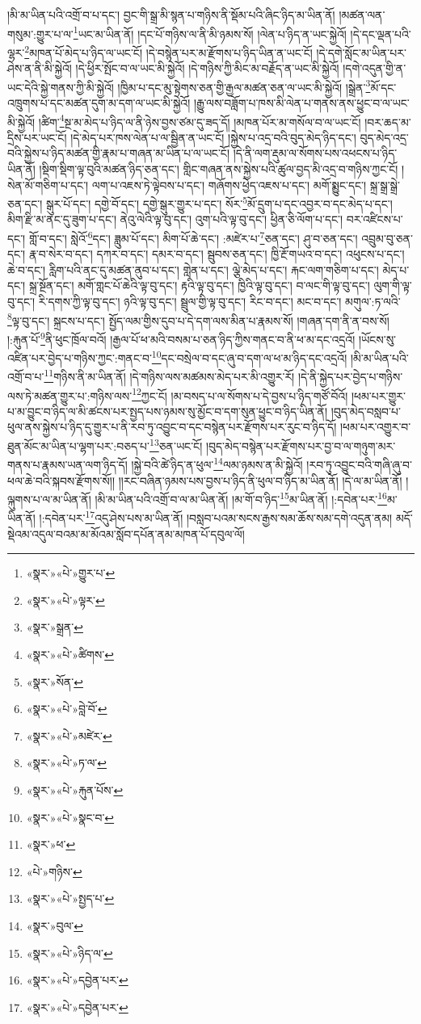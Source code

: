 །མི་མ་ཡིན་པའི་འགྲོ་བ་པ་དང་། བྱང་གི་སྒྲ་མི་སྙན་པ་གཉིས་ནི་སྡོམ་པའི་ཞིང་ཉིད་མ་ཡིན་ནོ། །མཚན་ལན་གསུམ་:གྱུར་པ་ལ་\footnote{«སྣར་»«པེ་»གྱུར་པ་}ཡང་མ་ཡིན་ནོ། །དང་པོ་གཉིས་ལ་ནི་མི་ཉམས་སོ། །ལེན་པ་ཉིད་ན་ཡང་སྐྱེའོ། །དེ་དང་ལྡན་པའི་ལྷར་\footnote{«སྣར་»«པེ་»ལྟར་}མཁན་པོ་མེད་པ་ཉིད་ལ་ཡང་ངོ། །དེ་བསྙེན་པར་མ་རྫོགས་པ་ཉིད་ཡིན་ན་ཡང་ངོ། །དེ་དགེ་སློང་མ་ཡིན་པར་ཤེས་ན་ནི་མི་སྐྱེའོ། །དེ་ཕྱིར་སྤོང་བ་ལ་ཡང་མི་སྐྱེའོ། །དེ་གཉིས་ཀྱི་མིང་མ་བརྗོད་ན་ཡང་མི་སྐྱེའོ། །དགེ་འདུན་གྱི་ན་ཡང་དེའི་སྐྱེ་གནས་ཀྱི་མི་སྐྱེའོ། །ཁྱིམ་པ་དང་མུ་སྟེགས་ཅན་གྱི་རྒྱལ་མཚན་ཅན་ལ་ཡང་མི་སྐྱེའོ། །སྒྲེན་\footnote{«སྣར་»སྒྲན་}མོ་དང་འཁྲུགས་པ་དང་མཚན་དུག་མ་དག་ལ་ཡང་མི་སྐྱེའོ། །རྒྱུ་ལས་བཟློག་པ་ཁས་མི་ལེན་པ་གནས་ནས་ཕྱུང་བ་ལ་ཡང་མི་སྐྱེའོ། །ཚིག་\footnote{«སྣར་»«པེ་»ཚིགས་}སྔ་མ་མེད་པ་ཉིད་ལ་ནི་ཉེས་བྱས་ཙམ་དུ་ཟད་དོ། །མཁན་པོར་མ་གསོལ་བ་ལ་ཡང་ངོ། །བར་ཆད་མ་དྲིས་པར་ཡང་ངོ། །དེ་མེད་པར་ཁས་ལེན་པ་ལ་སྦྱིན་ན་ཡང་ངོ། །སྐྱེས་པ་འདྲ་བའི་བུད་མེད་ཉིད་དང་། བུད་མེད་འདྲ་བའི་སྐྱེས་པ་ཉིད་མཚན་གྱི་རྣམ་པ་གཞན་མ་ཡིན་པ་ལ་ཡང་ངོ། །དེ་ནི་ལག་རྡུམ་ལ་སོགས་པས་འཕངས་པ་ཉིད་ཡིན་ནོ། །སྡིག་སྡིག་ལྟ་བུའི་མཚན་ཉིད་ཅན་དང་། གླིང་གཞན་ནས་སྐྱེས་པའི་ཚུལ་བྱད་མི་འདྲ་བ་གཉིས་ཀྱང་ངོ། །སེན་མོ་གཅིག་པ་དང་། ལག་པ་འཇས་ཏེ་ལྟེབས་པ་དང་། གཞོགས་ཕྱེད་འཇས་པ་དང་། མགོ་སྨྱུང་དང་། སྐྲ་སྒྲ་སྒྲེ་ཅན་དང་། སྒུར་པོ་དང་། དགྱེ་བོ་དང་། དགྱེ་སྒུར་གྱུར་པ་དང་། སོར་\footnote{«སྣར་»སོན་}མོ་དྲུག་པ་དང་འབྱར་བ་དང་མེད་པ་དང་། མིག་རྫི་མ་ནང་དུ་ཟུག་པ་དང་། ནེའུ་ལེའི་ལྟ་བུ་དང་། འུག་པའི་ལྟ་བུ་དང་། ཕྱིན་ཅི་ལོག་པ་དང་། བར་འཛིངས་པ་དང་། གློ་བ་དང་། སླེའོ་\footnote{«སྣར་»«པེ་»བླེ་བོ་}དང་། ཟླུམ་པོ་དང་། མིག་པོ་ཆེ་དང་། :མཛེར་པ་\footnote{«སྣར་»«པེ་»མཛེར་}ཅན་དང་། ཤུ་བ་ཅན་དང་། འབྲུམ་བུ་ཅན་དང་། རྣ་བ་སེར་བ་དང་། དཀར་བ་དང་། དམར་བ་དང་། སྦུབས་ཅན་དང་། ཁྱི་རྔོ་གཡའ་བ་དང་། འཕུངས་པ་དང་། ཆེ་བ་དང་། རླིག་པའི་ནང་དུ་མཚན་ནུབ་པ་དང་། གླེན་པ་དང་། ལྕེ་མེད་པ་དང་། རྐང་ལག་གཅིག་པ་དང་། མེད་པ་དང་། སྐྲ་སྔོན་དང་། མགོ་གླང་པོ་ཆེའི་ལྟ་བུ་དང་། རྟའི་ལྟ་བུ་དང་། ཁྱིའི་ལྟ་བུ་དང་། བ་ལང་གི་ལྟ་བུ་དང་། ལུག་གི་ལྟ་བུ་དང་། རི་དགས་ཀྱི་ལྟ་བུ་དང་། ཉའི་ལྟ་བུ་དང་། སྦྲུལ་གྱི་ལྟ་བུ་དང་། རིང་བ་དང་། མང་བ་དང་། མགུལ་:ཏ་ལའི་\footnote{«སྣར་»«པེ་»ཏ་ལ་}ལྟ་བུ་དང་། སྐྲངས་པ་དང་། སྤྱོད་ལམ་གྱིས་དུབ་པ་དེ་དག་ལས་མིན་པ་རྣམས་སོ། །གཞན་དག་ནི་ན་བས་སོ། །:རྐུན་པོ་\footnote{«སྣར་»«པེ་»རྐུན་པོས་}ནི་ཕུང་ཁྲོལ་བའོ། །རྒྱལ་པོ་ཕ་མའི་བསམ་པ་ཅན་ཉིད་ཀྱིས་གནང་བ་ནི་ཕ་མ་དང་འདྲའོ། །ཡོངས་སུ་འཛིན་པར་བྱེད་པ་གཉིས་ཀྱང་:གནང་བ་\footnote{«སྣར་»«པེ་»སྣང་བ་}དང་བསྲེལ་བ་དང་ཞུ་བ་དག་ལ་ཕ་མ་ཉིད་དང་འདྲའོ། །མི་མ་ཡིན་པའི་འགྲོ་བ་པ་\footnote{«སྣར་»ཕ་}གཉིས་ནི་མ་ཡིན་ནོ། །དེ་གཉིས་ལས་མཚམས་མེད་པར་མི་འགྱུར་རོ། །དེ་ནི་སྐྱེད་པར་བྱེད་པ་གཉིས་ལས་ཏེ་མཚན་གྱུར་པ་:གཉིས་ལས་\footnote{«པེ་»གཉིས་}ཀྱང་ངོ། །མ་བསད་པ་ལ་སོགས་པ་དེ་བྱས་པ་ཉིད་གཙོ་བོའོ། །ཕམ་པར་གྱུར་པ་མ་བྱུང་བ་ཉིད་ལ་མི་ཚངས་པར་སྤྱད་པས་ཉམས་སུ་མྱོང་བ་དག་སུན་ཕྱུང་བ་ཉིད་ཡིན་ནོ། །བུད་མེད་བསླབ་པ་ཕུལ་ནས་སྐྱེས་པ་ཉིད་དུ་གྱུར་པ་ནི་རབ་ཏུ་འབྱུང་བ་དང་བསྙེན་པར་རྫོགས་པར་རུང་བ་ཉིད་དོ། །ཕམ་པར་འགྱུར་བ་ཐུན་མོང་མ་ཡིན་པ་ལྷག་པར་:བཅད་པ་\footnote{«སྣར་»«པེ་»སྤྱད་པ་}ཅན་ཡང་ངོ། །བུད་མེད་བསྙེན་པར་རྫོགས་པར་བྱ་བ་ལ་གཉུག་མར་གནས་པ་རྣམས་ཡན་ལག་ཉིད་དོ། །སྐྱེ་བའི་ཚེ་ཉིད་ན་ཕུལ་\footnote{«སྣར་»བུལ་}ལམ་ཉམས་ན་མི་སྐྱེའོ། །རབ་ཏུ་འབྱུང་བའི་གཞི་ཞུ་བ་ཕལ་ཆེ་བའི་སྐབས་རྫོགས་སོ།། །།རང་བཞིན་ཉམས་པས་བྱས་པ་ཉིད་ནི་ཕུལ་བ་ཉིད་མ་ཡིན་ནོ། །དེ་ལ་མ་ཡིན་ནོ། །ལྐུགས་པ་ལ་མ་ཡིན་ནོ། །མི་མ་ཡིན་པའི་འགྲོ་བ་ལ་མ་ཡིན་ནོ། །མ་གོ་བ་ཉིད་\footnote{«སྣར་»«པེ་»ཉིད་ལ་}མ་ཡིན་ནོ། །:དབེན་པར་\footnote{«སྣར་»«པེ་»དབྱེན་པར་}མ་ཡིན་ནོ། །:དབེན་པར་\footnote{«སྣར་»«པེ་»དབྱེན་པར་}འདུ་ཤེས་པས་མ་ཡིན་ནོ། །བསླབ་པའམ་སངས་རྒྱས་སམ་ཆོས་སམ་དགེ་འདུན་ནམ། མདོ་སྡེའམ་འདུལ་བའམ་མ་མོའམ་སློབ་དཔོན་ནམ་མཁན་པོ་དབུལ་ལོ། 